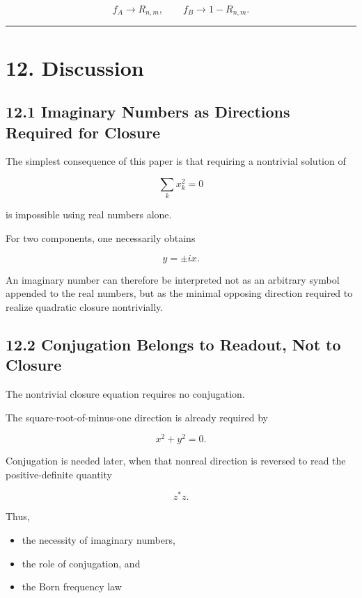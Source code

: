 \documentclass[
  a4paper,
  10pt]{article}
\providecommand{\tightlist}{%
  \setlength{\itemsep}{0pt}\setlength{\parskip}{0pt}}
\begin{document}
\[
f_A\to R_{n,m},
\qquad
f_B\to1-R_{n,m}.
\]

\begin{center}\rule{0.5\linewidth}{0.5pt}\end{center}

\section{12. Discussion}\label{12-discussion}

\subsection{12.1 Imaginary Numbers as Directions Required for
Closure}\label{121-imaginary-numbers-as-directions-required-for-closure}

The simplest consequence of this paper is that requiring a nontrivial
solution of

\[
\sum_kx_k^2=0
\]

is impossible using real numbers alone.

For two components, one necessarily obtains

\[
y=\pm ix.
\]

An imaginary number can therefore be interpreted not as an arbitrary
symbol appended to the real numbers, but as the minimal opposing
direction required to realize quadratic closure nontrivially.

\subsection{12.2 Conjugation Belongs to Readout, Not to
Closure}\label{122-conjugation-belongs-to-readout-not-to-closure}

The nontrivial closure equation requires no conjugation.

The square-root-of-minus-one direction is already required by

\[
x^2+y^2=0.
\]

Conjugation is needed later, when that nonreal direction is reversed to
read the positive-definite quantity

\[
z^*z.
\]

Thus,

\begin{itemize}
\tightlist
\item
  the necessity of imaginary numbers,
\item
  the role of conjugation, and
\item
  the Born frequency law
\end{itemize}
\end{document}
